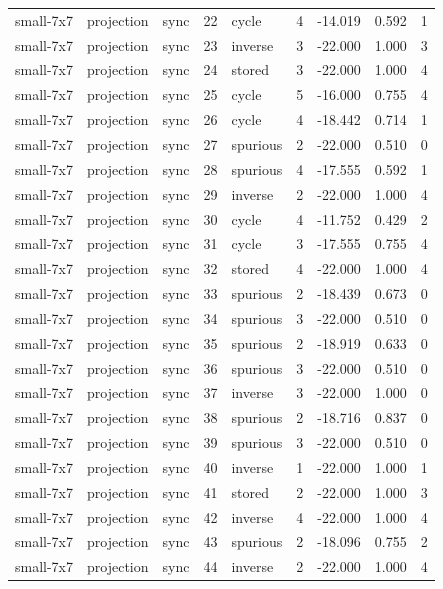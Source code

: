 \begin{tabular}{lllrlrrrr}
small-7x7 & projection & sync & 22 & cycle & 4 & -14.019 & 0.592 & 1 \\
small-7x7 & projection & sync & 23 & inverse & 3 & -22.000 & 1.000 & 3 \\
small-7x7 & projection & sync & 24 & stored & 3 & -22.000 & 1.000 & 4 \\
small-7x7 & projection & sync & 25 & cycle & 5 & -16.000 & 0.755 & 4 \\
small-7x7 & projection & sync & 26 & cycle & 4 & -18.442 & 0.714 & 1 \\
small-7x7 & projection & sync & 27 & spurious & 2 & -22.000 & 0.510 & 0 \\
small-7x7 & projection & sync & 28 & spurious & 4 & -17.555 & 0.592 & 1 \\
small-7x7 & projection & sync & 29 & inverse & 2 & -22.000 & 1.000 & 4 \\
small-7x7 & projection & sync & 30 & cycle & 4 & -11.752 & 0.429 & 2 \\
small-7x7 & projection & sync & 31 & cycle & 3 & -17.555 & 0.755 & 4 \\
small-7x7 & projection & sync & 32 & stored & 4 & -22.000 & 1.000 & 4 \\
small-7x7 & projection & sync & 33 & spurious & 2 & -18.439 & 0.673 & 0 \\
small-7x7 & projection & sync & 34 & spurious & 3 & -22.000 & 0.510 & 0 \\
small-7x7 & projection & sync & 35 & spurious & 2 & -18.919 & 0.633 & 0 \\
small-7x7 & projection & sync & 36 & spurious & 3 & -22.000 & 0.510 & 0 \\
small-7x7 & projection & sync & 37 & inverse & 3 & -22.000 & 1.000 & 0 \\
small-7x7 & projection & sync & 38 & spurious & 2 & -18.716 & 0.837 & 0 \\
small-7x7 & projection & sync & 39 & spurious & 3 & -22.000 & 0.510 & 0 \\
small-7x7 & projection & sync & 40 & inverse & 1 & -22.000 & 1.000 & 1 \\
small-7x7 & projection & sync & 41 & stored & 2 & -22.000 & 1.000 & 3 \\
small-7x7 & projection & sync & 42 & inverse & 4 & -22.000 & 1.000 & 4 \\
small-7x7 & projection & sync & 43 & spurious & 2 & -18.096 & 0.755 & 2 \\
small-7x7 & projection & sync & 44 & inverse & 2 & -22.000 & 1.000 & 4 \\

\end{tabular}
